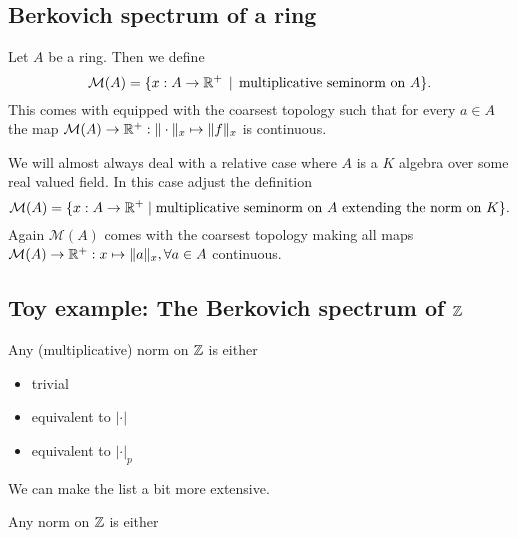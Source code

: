 
\subsection{Berkovich spectrum of a ring} \label{sec:berkovich_spectrum_of_a_ring}

\begin{definition}
	Let $A$ be a ring. Then we define \[
		\mathcal{M} (A) = \{x: A \to \R^{+} \st \text{multiplicative seminorm on } A\} 
	.\] 
	This comes with equipped with the coarsest topology such that for every $a \in A$ the map $\mathcal{M} (A) \to \mathbb{R}^{+}: \|\cdot \|_x \mapsto \|f\|_x $ is continuous. 

	We will almost always deal with a relative case where $A$ is a $K$ algebra over some real valued field. In this case adjust the definition \[
		\mathcal{M} (A) = \{x : A \to \mathbb{R}^{ + }  \mid \text{multiplicative seminorm on }A \text{ extending the norm on } K\} 
	.\] 
	Again $\mathcal{M} (A)$ comes with the coarsest topology making all maps $\mathcal{M} (A) \to \mathbb{R}^{+}: x \mapsto \|a\|_x, \forall a \in A$ continuous. 
\end{definition}

\subsection{Toy example: The Berkovich spectrum of $\mathbb{Z}$} \label{sec:toy_example:_the_berkovich_spectrum_of_Z}

\begin{theorem}
	[Ostrowski]
	Any (multiplicative) norm on  $\mathbb{Z}$ is either
	\begin{itemize}
		\item  trivial
		\item equivalent to  $|\cdot |$
		\item equivalent to $|\cdot |_p$
	\end{itemize}
\end{theorem}

We can make the list a bit more extensive. 
\begin{corollary}
	Any norm on $\mathbb{Z}$ is either  
\end{corollary}




